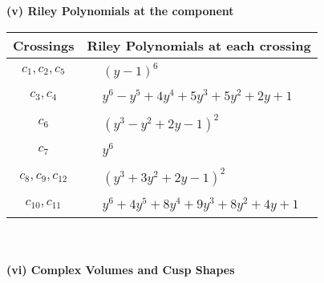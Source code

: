 \documentclass[1p]{elsarticle_modified}
\theoremstyle{definition}
\begin{document}
\newpage\renewcommand{\arraystretch}{1}
\flushleft \textbf{(v) Riley Polynomials at the component}\newline \\
\begin{tabular}{m{50pt}|m{274pt}}
Crossings & \hspace{64pt}Riley Polynomials at each crossing \\
\hline $$\begin{aligned}c_{1},c_{2},c_{5}\end{aligned}$$&$\begin{aligned}
&(y-1)^6
\end{aligned}$\\
\hline $$\begin{aligned}c_{3},c_{4}\end{aligned}$$&$\begin{aligned}
&y^6- y^5+4 y^4+5 y^3+5 y^2+2 y+1
\end{aligned}$\\
\hline $$\begin{aligned}c_{6}\end{aligned}$$&$\begin{aligned}
&(y^3- y^2+2 y-1)^2
\end{aligned}$\\
\hline $$\begin{aligned}c_{7}\end{aligned}$$&$\begin{aligned}
&y^6
\end{aligned}$\\
\hline $$\begin{aligned}c_{8},c_{9},c_{12}\end{aligned}$$&$\begin{aligned}
&(y^3+3 y^2+2 y-1)^2
\end{aligned}$\\
\hline $$\begin{aligned}c_{10},c_{11}\end{aligned}$$&$\begin{aligned}
&y^6+4 y^5+8 y^4+9 y^3+8 y^2+4 y+1
\end{aligned}$\\
\hline
\end{tabular}\\~\\
\newpage\flushleft \textbf{(vi) Complex Volumes and Cusp Shapes}
\end{document}
